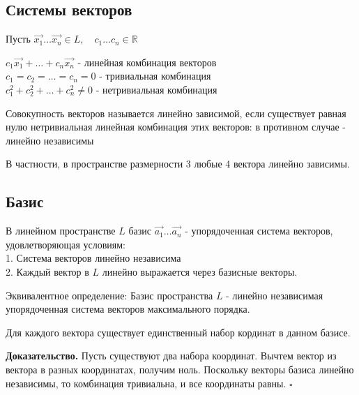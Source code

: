 \subsection{Системы векторов}
Пусть $\Vec{x_1}\ldots\Vec{x_n}\in L,\quad c_1\ldots c_n \in \mathbb R$
\begin{defin}
$c_1\Vec{x_1}+\ldots+c_n\Vec{x_n}$ - линейная комбинация векторов\\
$c_1=c_2=\ldots=c_n=0$ - тривиальная комбинация\\
$c_1^2+c_2^2+\ldots+c_n^2\ne0$ - нетривиальная комбинация
\end{defin}
\begin{defin}
Совокупность векторов называется линейно зависимой, если существует
равная нулю нетривиальная линейная комбинация этих векторов: в противном случае
- линейно независимы
\end{defin}
В частности, в пространстве размерности 3 любые 4 вектора линейно зависимы. 
\subsection{Базис}
\begin{defin}
В линейном пространстве $L$ базис $\Vec{a_1}\ldots\Vec{a_n}$ - упорядоченная
система векторов, удовлетворяющая условиям:\\
1. Система векторов линейно независима\\
2. Каждый вектор в $L$ линейно выражается через базисные векторы.
\end{defin}
Эквивалентное определение: Базис пространства $L$ - линейно независимая
упорядоченная система векторов максимального порядка. 

\begin{theor}
Для каждого вектора существует единственный набор кординат в данном базисе.
\end{theor}
\textbf{Доказательство.} Пусть существуют два набора координат.
Вычтем вектор из вектора в разных координатах, получим ноль.
Поскольку векторы базиса линейно независимы, то комбинация тривиальна, и все
координаты равны. $\square$

